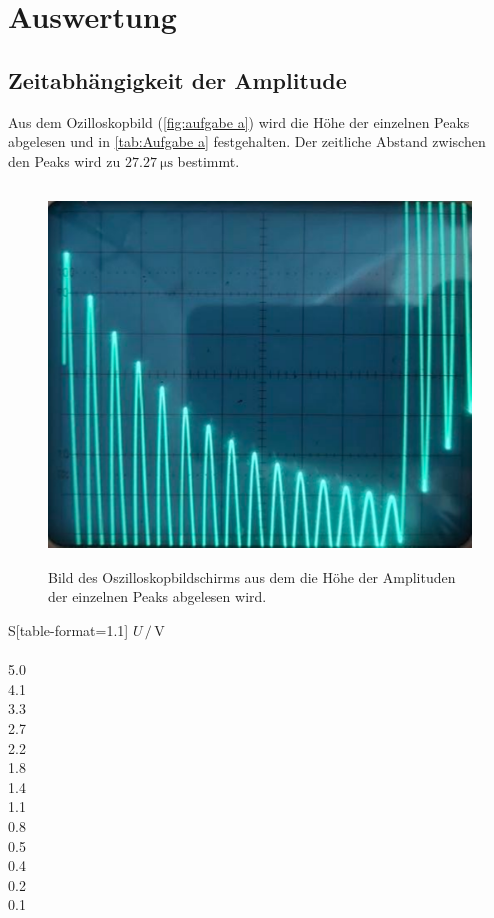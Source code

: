 \section{Auswertung}
\label{sec:Auswertung}

\subsection{Zeitabhängigkeit der Amplitude}
\label{sec:Zeitabhängigkeit der Amplitude}
Aus dem Ozilloskopbild (\autoref{fig:aufgabe a}) wird die Höhe der einzelnen Peaks abgelesen und in \autoref{tab:Aufgabe a} festgehalten. Der 
zeitliche Abstand zwischen den Peaks wird zu $\qty{27,27}{\micro\second}$ bestimmt.

\begin{figure} [H]
  \centering
  \includegraphics[height=10cm]{content/Bilder/Aufgabe_a.pdf}
  \caption{Bild des Oszilloskopbildschirms aus dem die Höhe der Amplituden der einzelnen Peaks abgelesen wird.}
  \label{fig:aufgabe a}
\end{figure}

\begin{table}
  \centering
  \caption{Amplitude der einzelnen Peaks aus \autoref{fig:aufgabe a} mit einem zeitlichen Abstand von $\qty{27,27}{\micro\second}$.}
  \label{tab:Aufgabe a}
  \begin{tabular}{S[table-format=1.1]}
    \toprule
    {$U\,/\,\unit{\volt}$} \\
     \\
    5.0 \\
    4.1 \\
    3.3 \\
    2.7 \\
    2.2 \\
    1.8 \\
    1.4 \\
    1.1 \\
    0.8 \\
    0.5 \\
    0.4 \\
    0.2 \\
    0.1 \\
    \bottomrule
  \end{tabular}
\end{table}

